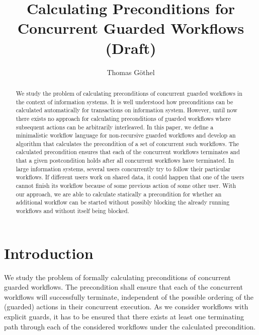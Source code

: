 \documentclass[11pt]{article}
\title{Calculating Preconditions for \\ Concurrent Guarded Workflows (Draft)}
\author{Thomas Göthel \and \TODO{tbd}}
\date{}
\begin{document}
\maketitle

\begin{abstract}
We study the problem of calculating preconditions of concurrent guarded workflows in the context of information systems. 
It is well understood how preconditions can be calculated automatically for transactions on information system. However, until now there exists no approach for calculating preconditions of guarded workflows where subsequent actions can be arbitrarily interleaved.
In this paper, we define a minimalistic workflow language for non-recursive guarded workflows and develop an algorithm that calculates the precondition of a set of concurrent such workflows. The calculated precondition ensures that each of the concurrent workflows terminates and that a given postcondition holds after all concurrent workflows have terminated.
In large information systems, several users concurrently try to follow their particular workflows. If different users work on shared data, it could happen that one of the users cannot finish its workflow because of some previous action of some other user. With our approach, we are able to calculate statically a precondition for whether an additional workflow can be started without possibly blocking the already running workflows and without itself being blocked.
\end{abstract}

\section{Introduction}

We study the problem of formally calculating preconditions of concurrent guarded workflows. The precondition shall ensure that each of the concurrent workflows will successfully terminate, independent of the possible ordering of the (guarded) actions in their concurrent execution. As we consider workflows with explicit guards, it has to be ensured that there exists at least one terminating path through each of the considered workflows under the calculated precondition.
\end{document}
